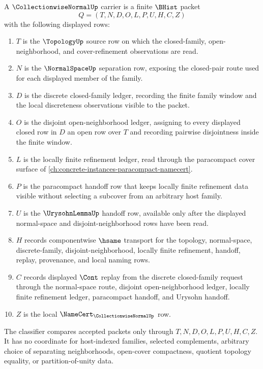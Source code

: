 \begin{definition}
\label{def:collectionwise-normal-carrier}
A $\CollectionwiseNormalUp$ carrier is a finite $\BHist$ packet
$$
Q=(T,N,D,O,L,P,U,H,C,Z)
$$
with the following displayed rows:
\begin{enumerate}
\item $T$ is the $\TopologyUp$ source row on which the closed-family, open-neighborhood, and cover-refinement observations are read.
\item $N$ is the $\NormalSpaceUp$ separation row, exposing the closed-pair route used for each displayed member of the family.
\item $D$ is the discrete closed-family ledger, recording the finite family window and the local discreteness observations visible to the packet.
\item $O$ is the disjoint open-neighborhood ledger, assigning to every displayed closed row in $D$ an open row over $T$ and recording pairwise disjointness inside the finite window.
\item $L$ is the locally finite refinement ledger, read through the paracompact cover surface of \autoref{ch:concrete-instances-paracompact-namecert}.
\item $P$ is the paracompact handoff row that keeps locally finite refinement data visible without selecting a subcover from an arbitrary host family.
\item $U$ is the $\UrysohnLemmaUp$ handoff row, available only after the displayed normal-space and disjoint-neighborhood rows have been read.
\item $H$ records componentwise $\hsame$ transport for the topology, normal-space, discrete-family, disjoint-neighborhood, locally finite refinement, handoff, replay, provenance, and local naming rows.
\item $C$ records displayed $\Cont$ replay from the discrete closed-family request through the normal-space route, disjoint open-neighborhood ledger, locally finite refinement ledger, paracompact handoff, and Urysohn handoff.
\item $Z$ is the local $\NameCert_{\CollectionwiseNormalUp}$ row.
\end{enumerate}
The classifier compares accepted packets only through $T,N,D,O,L,P,U,H,C,Z$. It has no coordinate for host-indexed families, selected complements, arbitrary choice of separating neighborhoods, open-cover compactness, quotient topology equality, or partition-of-unity data.
\end{definition}

